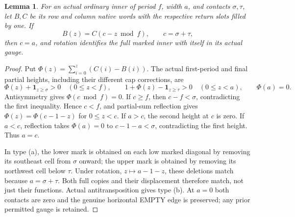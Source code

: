 \documentclass[11pt,a4paper]{amsart}
\numberwithin{equation}{section}
\theoremstyle{plain}
\newtheorem{lemma}[theorem]{Lemma}
\theoremstyle{definition}
\newcommand{\one}{\mathbf1}
\begin{document}
\begin{lemma}\label{ge:ordinary-reflection}
For an actual ordinary inner of period \(f\), width \(a\), and contacts
\(\sigma,\tau\), let \(B,C\) be its row and column native words with
the respective return slots filled by one.  If
\[
 B(z)=C(c-z\bmod f),\qquad c=\sigma+\tau,
\]
then \(c=a\), and rotation identifies the \emph{full} marked inner with
itself in its actual gauge.
\end{lemma}
\begin{proof}
Put \(\Phi(z)=\sum_{i=0}^z(C(i)-B(i))\).  The actual first-period and
final partial heights, including their different cap corrections, are
\begin{equation}\label{ge:eq:reflection-heights}
 \Phi(z)+\one_{z\ge\sigma}>0\quad(0\le z<f),\qquad
 1+\Phi(z)-\one_{z\ge\tau}>0\quad(0\le z<a),
 \qquad \Phi(a)=0.
\end{equation}
Antisymmetry gives \(\Phi(c\bmod f)=0\).  If \(c\ge f\), then
\(c-f<\sigma\), contradicting the first inequality.  Hence \(c<f\),
and partial-sum reflection gives
\(\Phi(z)=\Phi(c-1-z)\) for \(0\le z<c\).  If \(a>c\), the second
height at \(c\) is zero.  If \(a<c\), reflection takes \(\Phi(a)=0\)
to \(c-1-a<\sigma\), contradicting the first height.  Thus \(a=c\).

In type (a), the lower mark is obtained on each low marked diagonal by
removing its southeast cell from \(\sigma\) onward; the upper mark is
obtained by removing its northwest cell below \(\tau\).  Under rotation,
\(z\mapsto a-1-z\), these deletions match because
\(a=\sigma+\tau\).  Both full copies and their displacement therefore
match, not just their functions.  Actual antitransposition gives type
(b).  At \(a=0\) both contacts are zero and the genuine horizontal EMPTY
edge is preserved; any prior permitted gauge is retained.
\end{proof}
\end{document}
